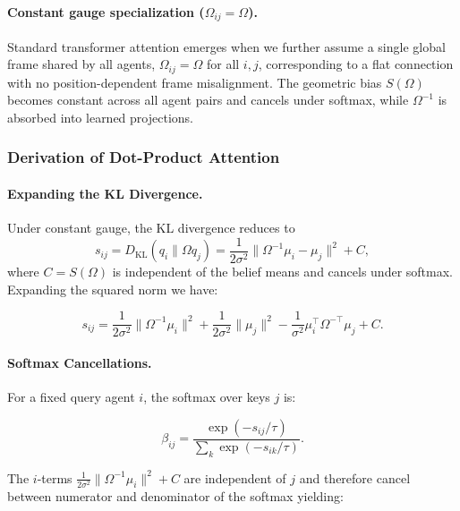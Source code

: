 \documentclass[twoside,11pt]{article}
\begin{document}
\paragraph{Constant gauge specialization ($\Omega_{ij} = \Omega$).}

Standard transformer attention emerges when we further assume a single global frame shared by all agents, $\Omega_{ij} = \Omega$ for all $i,j$, corresponding to a flat connection with no position-dependent frame misalignment. The geometric bias $S(\Omega)$ becomes constant across all agent pairs and cancels under softmax, while $\Omega^{-1}$ is absorbed into learned projections.

\subsubsection{Derivation of Dot-Product Attention}
\label{sec:dot_product_derivation}

\paragraph{Expanding the KL Divergence.}

Under constant gauge, the KL divergence reduces to
\begin{equation}
s_{ij} = D_{\mathrm{KL}}(q_i \| \Omega q_j) = \frac{1}{2\sigma^2}\|\Omega^{-1}\mu_i - \mu_j\|^2 + C,
\end{equation}
where $C = S(\Omega)$ is independent of the belief means and cancels under softmax. Expanding the squared norm we have:


\begin{equation}
s_{ij} = \frac{1}{2\sigma^2}\|\Omega^{-1}\mu_i\|^2 + \frac{1}{2\sigma^2}\|\mu_j\|^2 - \frac{1}{\sigma^2}\mu_i^\top \Omega^{-\top}\mu_j + C.
\end{equation}

\paragraph{Softmax Cancellations.}

For a fixed query agent $i$, the softmax over keys $j$ is:

\begin{equation}
\beta_{ij} = \frac{\exp(-s_{ij}/\tau)}{\sum_k \exp(-s_{ik}/\tau)}.
\end{equation}

The $i$-terms $\frac{1}{2\sigma^2}\|\Omega^{-1}\mu_i\|^2 + C$ are independent of $j$ and therefore cancel between numerator and denominator of the softmax yielding:
\end{document}
